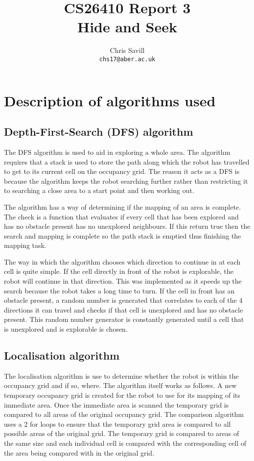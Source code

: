 \documentclass[a4paper,12pt]{article}
\title{CS26410 Report 3\\
Hide and Seek}
\author{Chris Savill\\\texttt{chs17@aber.ac.uk}}
\begin{document}
\maketitle
\newpage
\tableofcontents
\newpage

\section{Description of algorithms used}

\subsection{Depth-First-Search (DFS) algorithm}
\noindent The DFS algorithm is used to aid in exploring a whole area. The algorithm requires that a stack is used to store the path along which the robot has travelled to get to its current cell on the occupancy grid. The reason it acts as a DFS is because the algorithm keeps the robot searching further rather than restricting it to searching a close area to a start point and then working out.

\vspace{5mm}
\noindent The algorithm has a way of determining if the mapping of an area is complete. The check is a function that evaluates if every cell that has been explored and has no obstacle present has no unexplored neighbours. If this return true then the search and mapping is complete so the path stack is emptied thus finishing the mapping task.

\vspace{5mm}
\noindent The way in which the algorithm chooses which direction to continue in at each cell is quite simple. If the cell directly in front of the robot is explorable, the robot will continue in that direction. This was implemented as it speeds up the search because the robot takes a long time to turn. If the cell in front has an obstacle present, a random number is generated that correlates to each of the 4 directions it can travel and checks if that cell is unexplored and has no obstacle present. This random number generator is constantly generated until a cell that is unexplored and is explorable is chosen.

\subsection{Localisation algorithm}
\noindent The localisation algorithm is use to determine whether the robot is within the occupancy grid and if so, where. The algorithm itself works as follows. A new temporary occupancy grid is created for the robot to use for its mapping of its immediate area. Once the immediate area is scanned the temporary grid is compared to all areas of the original occupancy grid. The comparison algorithm uses a 2 for loops to ensure that the temporary grid area is compared to all possible areas of the original grid. The temporary grid is compared to areas of the same size and each individual cell is compared with the corresponding cell of the area being compared with in the original grid.
\end{document}
